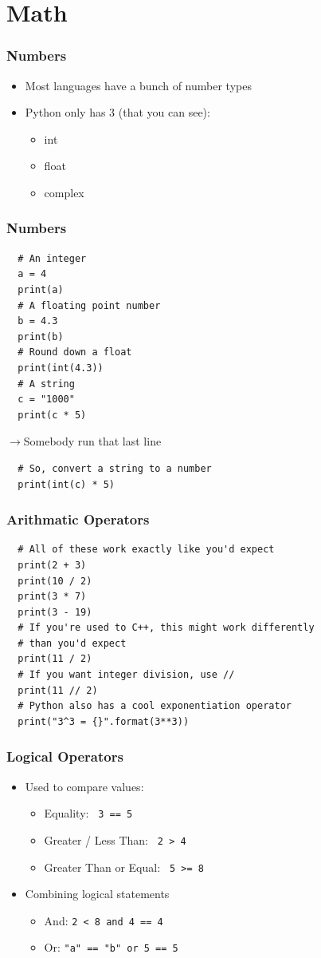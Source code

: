 \documentclass[aspectratio=169]{beamer}
\begin{document}
\section{Math}
\begin{frame}
  \frametitle{Numbers}
  \begin{itemize}
    \item Most languages have a bunch of number types
    \pause
    \item Python only has 3 (that you can see):
    \begin{itemize}
      \item int
      \item float
      \item complex
    \end{itemize}
  \end{itemize}
\end{frame}
\begin{frame}[fragile]
  \frametitle{Numbers}
  \begin{verbatim}
  # An integer
  a = 4
  print(a)
  # A floating point number
  b = 4.3
  print(b)
  # Round down a float
  print(int(4.3))
  # A string
  c = "1000"
  print(c * 5)
  \end{verbatim}
  \pause
  $\rightarrow$Somebody run that last line
  \pause
  \begin{verbatim}
  # So, convert a string to a number
  print(int(c) * 5)
  \end{verbatim}
\end{frame}
\begin{frame}[fragile]
  \frametitle{Arithmatic Operators}
  \begin{verbatim}
  # All of these work exactly like you'd expect
  print(2 + 3)
  print(10 / 2)
  print(3 * 7)
  print(3 - 19)
  # If you're used to C++, this might work differently
  # than you'd expect
  print(11 / 2)
  # If you want integer division, use //
  print(11 // 2)
  # Python also has a cool exponentiation operator
  print("3^3 = {}".format(3**3))
  \end{verbatim}
\end{frame}
\begin{frame}
  \frametitle{Logical Operators}
  \begin{itemize}
    \item Used to compare values:
      \begin{itemize}
        \item Equality: \texttt{ 3 == 5}
        \item Greater / Less Than: \texttt{ 2 > 4}
        \item Greater Than or Equal: \texttt{ 5 >= 8}
      \end{itemize}
      \pause
    \item Combining logical statements
    \begin{itemize}
      \item And: \texttt{2 < 8 and 4 == 4}
      \item Or: \texttt{"a" == "b" or 5 == 5}
    \end{itemize} 
  \end{itemize}
\end{frame}
\end{document}
